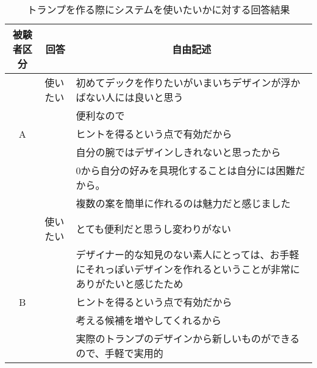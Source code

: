 \begin{table}[htbp]
    \centering
    \caption{トランプを作る際にシステムを使いたいかに対する回答結果}
    \begin{tabular}{|c|p{7em}|p{26em}|} \hline
        被験者区分 & \multicolumn{1}{|c|}{回答} & \multicolumn{1}{|c|}{自由記述} \\ \hline
        & 使いたい&初めてデックを作りたいがいまいちデザインが浮かばない人には良いと思う\\ \cline{3-3}
         & &便利なので\\ \cline{3-3}
        A & &ヒントを得るという点で有効だから\\ \cline{3-3}
         & &自分の腕ではデザインしきれないと思ったから\\\cline{3-3}
         & &0から自分の好みを具現化することは自分には困難だから。\\ \cline{3-3}
         & &複数の案を簡単に作れるのは魅力だと感じました\\ \hline
        & 使いたい&とても便利だと思うし変わりがない\\ \cline{3-3}
         & & デザイナー的な知見のない素人にとっては、お手軽にそれっぽいデザインを作れるということが非常にありがたいと感じたため\\ \cline{3-3}
        B & &ヒントを得るという点で有効だから\\\cline{3-3}
         & &考える候補を増やしてくれるから\\\cline{3-3}
         & &実際のトランプのデザインから新しいものができるので、手軽で実用的\\\hline

    \end{tabular}
    \label{free3}
\end{table}

